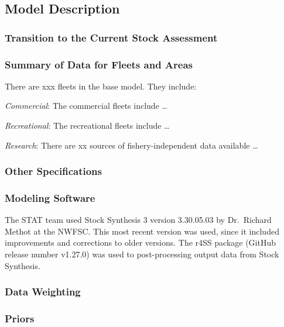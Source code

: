 \documentclass[12pt,]{article}
\begin{document}
\subsection{Model Description}\label{model-description}

\subsubsection{Transition to the Current Stock
Assessment}\label{transition-to-the-current-stock-assessment}

\subsubsection{Summary of Data for Fleets and
Areas}\label{summary-of-data-for-fleets-and-areas}

There are xxx fleets in the base model. They include:

\emph{Commercial}: The commercial fleets include \ldots{}

\emph{Recreational}: The recreational fleets include \ldots{}

\emph{Research}: There are xx sources of fishery-independent data
available \ldots{}

\subsubsection{Other Specifications}\label{other-specifications}

\subsubsection{Modeling Software}\label{modeling-software}

The STAT team used Stock Synthesis 3 version 3.30.05.03 by Dr.~Richard
Methot at the NWFSC. This most recent version was used, since it
included improvements and corrections to older versions. The r4SS
package (GitHub release number v1.27.0) was used to post-processing
output data from Stock Synthesis.

\subsubsection{Data Weighting}\label{data-weighting}

\subsubsection{Priors}\label{priors}
\end{document}
